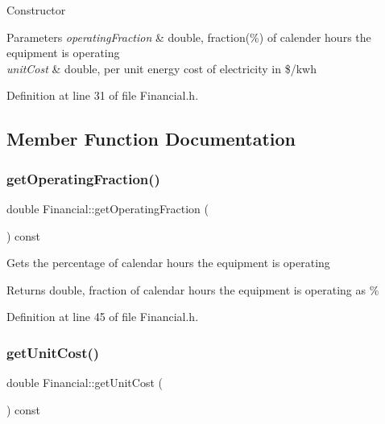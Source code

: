 Constructor 
\begin{DoxyParams}{Parameters}
{\em operating\+Fraction} & double, fraction(\%) of calender hours the equipment is operating \\
\hline
{\em unit\+Cost} & double, per unit energy cost of electricity in \$/kwh \\
\hline
\end{DoxyParams}


Definition at line 31 of file Financial.\+h.



\subsection{Member Function Documentation}
\mbox{\label{class_financial_a650ee2678b49d8d19b541f15d5a37c05}} 
\subsubsection{\texorpdfstring{get\+Operating\+Fraction()}{getOperatingFraction()}}
{\footnotesize\ttfamily double Financial\+::get\+Operating\+Fraction (\begin{DoxyParamCaption}{ }\end{DoxyParamCaption}) const\hspace{0.3cm}{\ttfamily [inline]}}

Gets the percentage of calendar hours the equipment is operating \begin{DoxyReturn}{Returns}
double, fraction of calendar hours the equipment is operating as \% 
\end{DoxyReturn}


Definition at line 45 of file Financial.\+h.

\mbox{\label{class_financial_adc3092e8f4cfd065042638236d21eaf4}} 
\subsubsection{\texorpdfstring{get\+Unit\+Cost()}{getUnitCost()}}
{\footnotesize\ttfamily double Financial\+::get\+Unit\+Cost (\begin{DoxyParamCaption}{ }\end{DoxyParamCaption}) const\hspace{0.3cm}{\ttfamily [inline]}}

